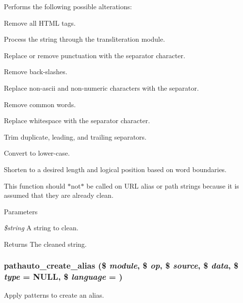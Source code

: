 Performs the following possible alterations:
\begin{DoxyItemize}
\item Remove all HTML tags.
\item Process the string through the transliteration module.
\item Replace or remove punctuation with the separator character.
\item Remove back-\/slashes.
\item Replace non-\/ascii and non-\/numeric characters with the separator.
\item Remove common words.
\item Replace whitespace with the separator character.
\item Trim duplicate, leading, and trailing separators.
\item Convert to lower-\/case.
\item Shorten to a desired length and logical position based on word boundaries.
\end{DoxyItemize}

This function should $\ast$not$\ast$ be called on URL alias or path strings because it is assumed that they are already clean.


\begin{DoxyParams}{Parameters}
\item[{\em \$string}]A string to clean. \end{DoxyParams}
\begin{DoxyReturn}{Returns}
The cleaned string. 
\end{DoxyReturn}
\hypertarget{pathauto_8inc_a7b68bec532634de11616779796a1fb7f}{
\subsubsection[{pathauto\_\-create\_\-alias}]{\setlength{\rightskip}{0pt plus 5cm}pathauto\_\-create\_\-alias (\$ {\em module}, \/  \$ {\em op}, \/  \$ {\em source}, \/  \$ {\em data}, \/  \$ {\em type} = {\ttfamily NULL}, \/  \$ {\em language} = {})}}
\label{pathauto_8inc_a7b68bec532634de11616779796a1fb7f}
Apply patterns to create an alias.



